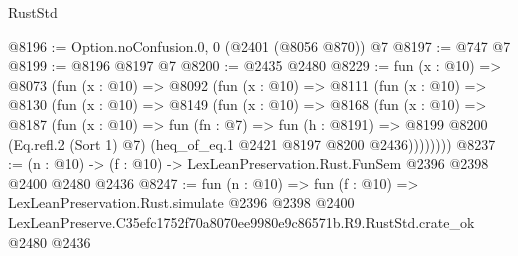 \begin{lexlean}{RustStd}
\begin{coremodule}
@8196 := Option.noConfusion.{0, 0} (@2401 (@8056 @870)) @7
@8197 := @747 @7
@8199 := @8196 @8197 @7
@8200 := @2435 @2480
@8229 := fun (x : @10) =>
  @8073
    (fun (x : @10) =>
    @8092
      (fun (x : @10) =>
      @8111
        (fun (x : @10) =>
        @8130
          (fun (x : @10) =>
          @8149
            (fun (x : @10) =>
            @8168
              (fun (x : @10) =>
              @8187
                (fun (x : @10) =>
                fun (fn : @7) =>
                fun (h : @8191) =>
                @8199 @8200 (Eq.refl.{2} (Sort 1) @7) (heq_of_eq.{1} @2421 @8197 @8200 @2436))))))))
@8237 := (n : @10) -> (f : @10) -> LexLeanPreservation.Rust.FunSem @2396 @2398 @2400 @2480 @2436
@8247 := fun (n : @10) =>
  fun (f : @10) =>
  LexLeanPreservation.Rust.simulate
    @2396
    @2398
    @2400
    LexLeanPreserve.C35efc1752f70a8070ee9980e9c86571b.R9.RustStd.crate_ok
    @2480
    @2436
\end{coremodule}
\end{lexlean}
